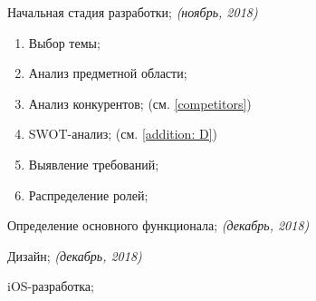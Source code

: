 
Начальная стадия разработки; \textit{(ноябрь, 2018)}
\begin{enumerate}
\item  Выбор темы;  
\item  Анализ предметной области; 
\item  Анализ конкурентов; (см. \ref{competitors})
\item  SWOT-анализ; (см. \ref{addition: D})
\item  Выявление требований;
\item  Распределение ролей;
\end{enumerate}

    \item  Определение основного функционала; \textit{(декабрь, 2018)}
    \item  Дизайн; \textit{(декабрь, 2018)}
    \item  iOS-разработка; 
